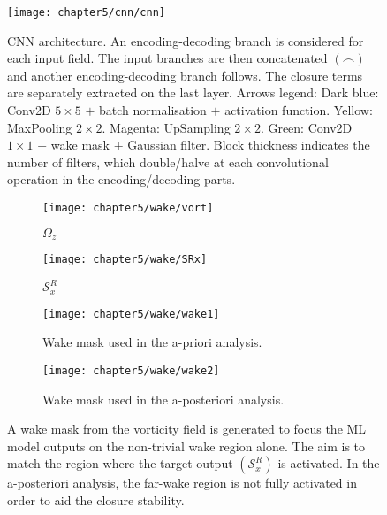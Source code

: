 \documentclass[../main.tex]{subfiles}
\begin{document}
\begin{figure}[t]
\centering
\texttt{[image: chapter5/cnn/cnn]}\vspace{-0.1cm}
\caption{CNN architecture.
An encoding-decoding branch is considered for each input field.
The input branches are then concatenated $(\frown)$ and another encoding-decoding branch follows.
The closure terms are separately extracted on the last layer.
Arrows legend: Dark blue: Conv2D $5\times5$ $+$ batch normalisation $+$ activation function.
Yellow: MaxPooling $2\times2$.
Magenta: UpSampling $2\times2$.
Green: Conv2D $1\times1$ $+$ wake mask $+$ Gaussian filter.
Block thickness indicates the number of filters, which double/halve at each convolutional operation in the encoding/decoding parts.}
\label{fig:cnn2}
\end{figure}

\begin{figure}[!ht]
\centering
\begin{subfigure}{0.7\linewidth}
 	\texttt{[image: chapter5/wake/vort]}
 	\caption{$\Omega_z$} 
\end{subfigure}
\begin{subfigure}{0.7\linewidth}
    \texttt{[image: chapter5/wake/SRx]}
	\caption{$\mathcal{S}^R_x$}
\end{subfigure}
\begin{subfigure}{0.7\linewidth}
	\texttt{[image: chapter5/wake/wake1]}
	\caption{Wake mask used in the a-priori analysis.}\label{fig:wake1}
\end{subfigure}
\begin{subfigure}{0.7\linewidth}
	\texttt{[image: chapter5/wake/wake2]} 
	\caption{Wake mask used in the a-posteriori analysis.}\label{fig:wake2}
\end{subfigure}
\caption{A wake mask from the vorticity field is generated to focus the ML model outputs on the non-trivial wake region alone. The aim is to match the region where the target output $(\mathcal{S}^R_x)$ is activated. In the a-posteriori analysis, the far-wake region is not fully activated in order to aid the closure stability.}
\end{figure}
\end{document}
